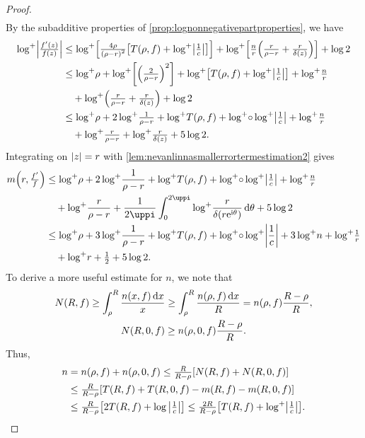 \begin{proof}
\begin{align*}
    \end{align*}
    By the subadditive properties of \cref{prop:lognonnegativepartproperties}, we have
    \begin{align*}
        \logp\abs{\tfrac{f'(z)}{f(z)}}&\leq\logp\qty[\tfrac{4\rho}{\qty(\rho-r)^2}\qty[T(\rho,f)+\logp\abs{\tfrac1{c}}]]+\logp\qty[\tfrac{n}{r}\qty(\tfrac{r}{\rho-r}+\tfrac{r}{\delta(z)})]+\log 2\\
        &\leq\logp\rho+\logp\qty[\qty(\tfrac{2}{\rho-r})^2]+\logp\qty[T(\rho,f)+\logp\abs{\tfrac1{c}}]+\logp\tfrac{n}{r}\\
        &\quad+\logp\qty(\tfrac{r}{\rho-r}+\tfrac{r}{\delta(z)})+\log2\\
        &\leq\logp\rho+2\logp\tfrac{1}{\rho-r}+\logp T(\rho,f)+\logp\circ\logp\abs{\tfrac1{c}}+\logp\tfrac{n}{r}\\
        &\quad+\logp\tfrac{r}{\rho-r}+\logp\tfrac{r}{\delta(z)}+5\log2.
    \end{align*}
    Integrating on \(\abs{z}=r\) with \cref{lem:nevanlinnasmallerrortermestimation2} gives
    \begin{align}
        m\qty(r,\tfrac{f'}f)&\leq\logp\rho+2\logp\frac{1}{\rho-r}+\logp T(\rho,f)+\logp\circ\logp\abs{\tfrac1{c}}+\logp\tfrac{n}{r}\nonumber\\
        &\quad+\logp\frac{r}{\rho-r}+\frac1{2\uppi}\int_0^{2\uppi}\logp\frac{r}{\delta\qty(r\ee^{\ii\theta})}\dd{\theta}+5\log2\nonumber\\
        &\leq\logp\rho+3\logp\frac{1}{\rho-r}+\logp T(\rho,f)+\logp\circ\logp\abs{\frac1{c}}+3\logp n+\logp\tfrac{1}{r}\nonumber\\
        &\quad+\logp r+\tfrac12+5\log2.\label{eq:nevanlinnalogdiffproximityestimate_proximityprimaryestimate}
    \end{align}
    To derive a more useful estimate for \(n\), we note that
    \begin{gather*}
        N(R,f)\geq\int_\rho^R\frac{n(x,f)\dd{x}}{x}\geq\int_\rho^R\frac{n(\rho,f)\dd{x}}{R}=n(\rho,f)\frac{R-\rho}{R},\\
        N(R,0,f)\geq n(\rho,0,f)\frac{R-\rho}R.
    \end{gather*}
    Thus,
    \begin{align*}
        n&=n(\rho,f)+n(\rho,0,f)\leq\tfrac{R}{R-\rho}\qty[N(R,f)+N(R,0,f)]\\
        &\leq\tfrac{R}{R-\rho}\qty[T(R,f)+T(R,0,f)-m(R,f)-m(R,0,f)]\\
        &\leq\tfrac{R}{R-\rho}\qty[2T(R,f)+\log\abs{\tfrac1{c}}]\leq\tfrac{2R}{R-\rho}\qty[T(R,f)+\logp\abs{\tfrac1{c}}].

\end{align*}
\end{proof}
